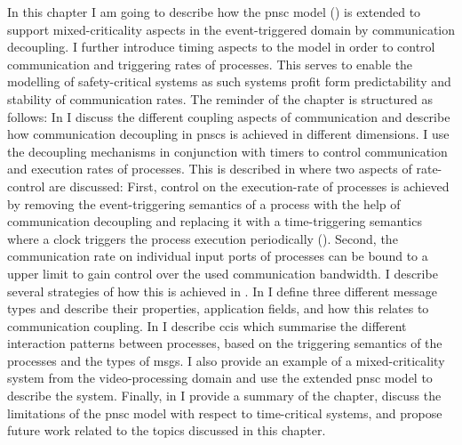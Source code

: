 In this chapter I am going to describe how the \gls{pnsc} model (\Chap{\ref{chap_ecm}}) is extended to support mixed-criticality aspects in the event-triggered domain by communication decoupling.
I further introduce timing aspects to the model in order to control communication and triggering rates of processes.
This serves to enable the modelling of safety-critical systems as such systems profit form predictability and stability of communication rates.
The reminder of the chapter is structured as follows:
In \Sect{\ref{sect_cci_decoupling}} I discuss the different coupling aspects of communication and describe how communication decoupling in \glspl{pnsc} is achieved in different dimensions.
I use the decoupling mechanisms in conjunction with timers to control communication and execution rates of processes.
This is described in \Sect{\ref{sect_tcm_time}} where two aspects of rate-control are discussed:
First, control on the execution-rate of processes is achieved by removing the event-triggering semantics of a process with the help of communication decoupling and replacing it with a time-triggering semantics where a clock triggers the process execution periodically (\SSect{\ref{sect_tcm_time_tt}}).
Second, the communication rate on individual input ports of processes can be bound to a upper limit to gain control over the used communication bandwidth.
I describe several strategies of how this is achieved in \SSect{\ref{sect_cci_decoupling_rate}}.
In \Sect{\ref{sect_tcm_msg}} I define three different message types and describe their properties, application fields, and how this relates to communication coupling.
In \Sect{\ref{sect_tcm_cci}} I describe \glspl{cci} which summarise the different interaction patterns between processes, based on the triggering semantics of the processes and the types of \glspl*{msg}.
I also provide an example of a mixed-criticality system from the video-processing domain and use the extended \gls{pnsc} model to describe the system.
Finally, in \Sect{\ref{sect_tcm_discussion}} I provide a summary of the chapter, discuss the limitations of the \gls{pnsc} model with respect to time-critical systems, and propose future work related to the topics discussed in this chapter.

